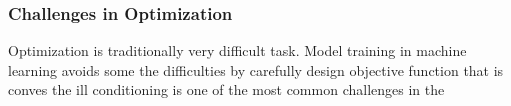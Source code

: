 \subsubsection{Challenges in Optimization}

Optimization is traditionally very difficult task. Model training in machine learning avoids some the difficulties by carefully design objective function that is conves
the ill conditioning is one of the most common challenges in the 